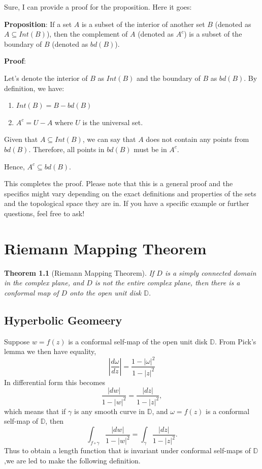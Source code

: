 \documentclass[
]{book}
\providecommand{\tightlist}{%
  \setlength{\itemsep}{0pt}\setlength{\parskip}{0pt}}
\newtheorem{theorem}{Theorem}[chapter]
\theoremstyle{definition}
\theoremstyle{definition}
\theoremstyle{definition}
\theoremstyle{definition}
\theoremstyle{remark}
\begin{document}
Sure, I can provide a proof for the proposition. Here it goes:

\textbf{Proposition}: If a set \(A\) is a subset of the interior of another set \(B\) (denoted as \(A \subseteq Int(B)\)), then the complement of \(A\) (denoted as \(A^c\)) is a subset of the boundary of \(B\) (denoted as \(bd(B)\)).

\textbf{Proof}:

Let's denote the interior of \(B\) as \(Int(B)\) and the boundary of \(B\) as \(bd(B)\). By definition, we have:

\begin{enumerate}
\def\labelenumi{\arabic{enumi}.}
\tightlist
\item
  \(Int(B) = B - bd(B)\)
\item
  \(A^c = U - A\) where \(U\) is the universal set.
\end{enumerate}

Given that \(A \subseteq Int(B)\), we can say that \(A\) does not contain any points from \(bd(B)\). Therefore, all points in \(bd(B)\) must be in \(A^c\).

Hence, \(A^c \subseteq bd(B)\).

This completes the proof. Please note that this is a general proof and the specifics might vary depending on the exact definitions and properties of the sets and the topological space they are in. If you have a specific example or further questions, feel free to ask!

\chapter{Riemann Mapping Theorem}\label{riemann-mapping-theorem}

\begin{theorem}[Riemann Mapping Theorem]
\protect\hypertarget{thm:unnamed-chunk-34}{}\label{thm:unnamed-chunk-34}If \(D\) is a simply connected domain in the complex plane, and \(D\) is not the entire complex plane, then there is a conformal map of \(D\) onto the open unit disk \(\mathbb{D}\).
\end{theorem}

\section{Hyperbolic Geomeery}\label{hyperbolic-geomeery}

Suppose \(w = f(z)\) is a conformal self-map of the open unit disk \(\mathbb{D}\). From Pick's lemma we then have equality,
\[\left|\frac{d\omega}{dz}\right|=\frac{1-|\omega|^2}{1-|z|^2}\]
In differential form this becomes
\[\frac{|dw|}{1-|w|^2} = \frac{|dz|}{1-|z|^2},\]
which means that if \(\gamma\) is any smooth curve in \(\mathbb{D}\), and \(\omega=f(z)\) is a conformal self-map of \(\mathbb{D}\), then
\[\int_{f\circ \gamma}\frac{|dw|}{1-|w|^2} =\int_{\gamma} \frac{|dz|}{1-|z|^2}.\]
Thus to obtain a length function that is invariant under conformal self-maps of \(\mathbb{D}\),we are led to make the following definition.
\end{document}
